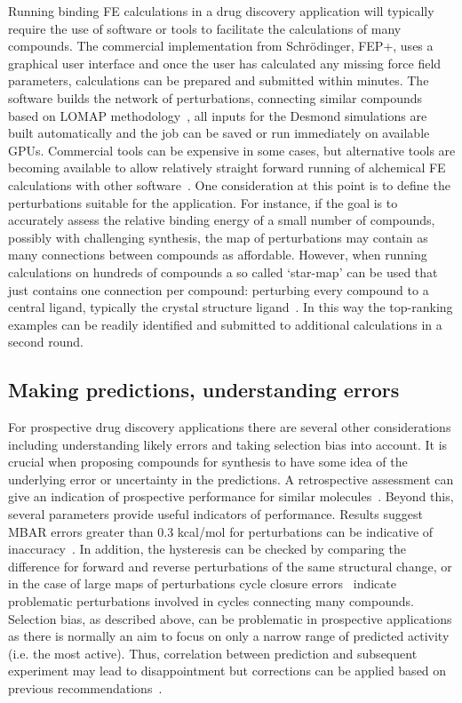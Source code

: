 \documentclass[9pt,bestpractices]{livecoms}
\begin{document}
Running binding FE calculations in a drug discovery application will typically require the use of software or tools to facilitate the calculations of many compounds. The commercial implementation from Schr\"{o}dinger, FEP+, uses a graphical user interface and once the user has calculated any missing force field parameters, calculations can be prepared and submitted within minutes. The software builds the network of perturbations, connecting similar compounds based on LOMAP methodology~\cite{liu2013lead}, all inputs for the Desmond simulations are built automatically and the job can be saved or run immediately on available GPUs. Commercial tools can be expensive in some cases, but alternative tools are becoming available to allow relatively straight forward running of alchemical FE calculations with other software~\cite{gapsys2015pmx, loeffler2015fesetup, song2019using, gapsys2020large,  jespers2019qligfep}. One consideration at this point is to define the perturbations suitable for the application. For instance, if the goal is to accurately assess the relative binding energy of a small number of compounds, possibly with challenging synthesis, the map of perturbations may contain as many connections between compounds as affordable. However, when running calculations on hundreds of compounds a so called ‘star-map’ can be used that just contains one connection per compound: perturbing every compound to a central ligand, typically the crystal structure ligand~\cite{konze2019reactionbased}. In this way the top-ranking examples can be readily identified and submitted to additional calculations in a second round. 
%
\subsection{Making predictions, understanding errors}
\label{subsec:predictions}
For prospective drug discovery applications there are several other considerations including understanding likely errors and taking selection bias into account. It is crucial when proposing compounds for synthesis to have some idea of the underlying error or uncertainty in the predictions. A retrospective assessment can give an indication of prospective performance for similar molecules~\cite{ciordia2016application}. Beyond this, several parameters provide useful indicators of performance. Results suggest MBAR errors greater than 0.3 kcal/mol for perturbations can be indicative of inaccuracy~\cite{perez-benito2019predicting}. In addition, the hysteresis can be checked by comparing the difference for forward and reverse perturbations of the same structural change, or in the case of large maps of perturbations cycle closure errors~\cite{wang2013modeling} indicate problematic perturbations involved in cycles connecting many compounds. Selection bias, as described above, can be problematic in prospective applications as there is normally an aim to focus on only a narrow range of predicted activity (i.e. the most active). Thus, correlation between prediction and subsequent experiment may lead to disappointment but corrections can be applied based on previous recommendations~\cite{abel2017critical}. 
\end{document}
